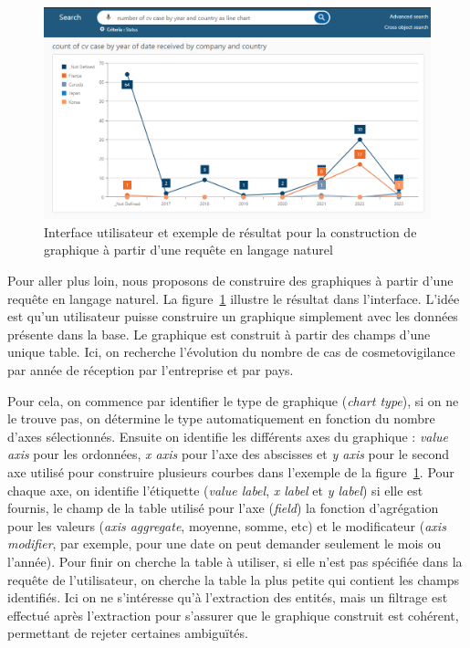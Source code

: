 \begin{figure}[htb]
    \centering
    \includegraphics[width=\textwidth]{these/part_2/chapter_2/imgs/ui-dashboard-compress.png}
    \caption[Interface utilisateur pour la construction de graphique]{Interface utilisateur et exemple de résultat pour la construction de graphique à partir d'une requête en langage naturel}
    \label{fig:nl-query:dashboard-ui}
\end{figure}

Pour aller plus loin, nous proposons de construire des graphiques à partir d'une requête en langage naturel.
La figure~\ref{fig:nl-query:dashboard-ui} illustre le résultat dans l'interface.
L'idée est qu'un utilisateur puisse construire un graphique simplement avec les données présente dans la base.
Le graphique est construit à partir des champs d'une unique table.
Ici, on recherche l'évolution du nombre de cas de cosmetovigilance par année de réception par l'entreprise et par pays.

Pour cela, on commence par identifier le type de graphique (\emph{chart type}), si on ne le trouve pas, on détermine le type automatiquement en fonction du nombre d'axes sélectionnés.
Ensuite on identifie les différents axes du graphique : \emph{value axis} pour les ordonnées, \emph{x axis} pour l'axe des abscisses et \emph{y axis} pour le second axe utilisé pour construire plusieurs courbes dans l'exemple de la figure~\ref{fig:nl-query:dashboard-ui}.
Pour chaque axe, on identifie l'étiquette (\emph{value label}, \emph{x label} et \emph{y label}) si elle est fournis, le champ de la table utilisé pour l'axe (\emph{field}) la fonction d'agrégation pour les valeurs (\emph{axis aggregate}, moyenne, somme, etc) et le modificateur (\emph{axis modifier}, par exemple, pour une date on peut demander seulement le mois ou l'année).
Pour finir on cherche la table à utiliser, si elle n'est pas spécifiée dans la requête de l'utilisateur, on cherche la table la plus petite qui contient les champs identifiés.
Ici on ne s'intéresse qu'à l'extraction des entités, mais un filtrage est effectué après l'extraction pour s'assurer que le graphique construit est cohérent, permettant de rejeter certaines ambiguïtés.

